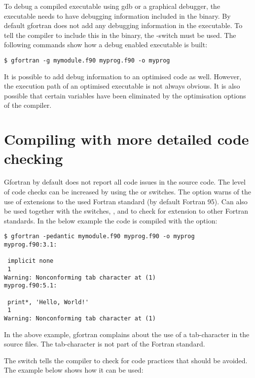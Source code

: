 To debug a compiled executable using gdb or a graphical debugger, the executable needs to have debugging information included in the binary. By default gfortran does not add any debugging information in the executable. To tell the compiler to include this in the binary, the -switch must be used. The following commands show how a debug enabled executable is built:

\begin{lstlisting}
$ gfortran -g mymodule.f90 myprog.f90 -o myprog
\end{lstlisting}

It is possible to add debug information to an optimised code as well. However, the execution path of an optimised executable is not always obvious. It is also possible that certain variables have been eliminated by the optimisation options of the compiler.

\section{Compiling with more detailed code checking}

Gfortran by default does not report all code issues in the source code. The level of code checks can be increased by using the  or  switches. The  option warns of the use of extensions to the used Fortran standard (by default Fortran 95). Can also be used together with the switches, ,  and  to check for extension to other Fortran standards. In the below example the code is compiled with the  option:

\begin{lstlisting}
$ gfortran -pedantic mymodule.f90 myprog.f90 -o myprog
myprog.f90:3.1:

 implicit none
 1
Warning: Nonconforming tab character at (1)
myprog.f90:5.1:

 print*, 'Hello, World!'
 1
Warning: Nonconforming tab character at (1)
\end{lstlisting}

In the above example, gfortran complains about the use of a tab-character in the source files. The tab-character is not part of the Fortran standard.

The  switch tells the compiler to check for code practices that should be avoided. The example below shows how it can be used:

